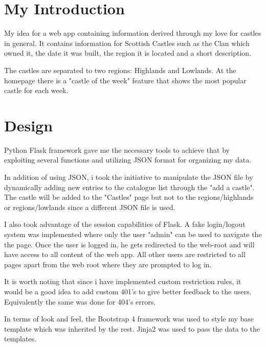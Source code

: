 \documentclass[10pt, a4paper]{article}
\title{\mytitle}
\author{\myauthor\hspace{1em}\\\contact\\Edinburgh Napier University\hspace{0.5em}-\hspace{0.5em}\mymodule}
\date{}
\begin{document}
	\maketitle

    

	\section{ My Introduction}
	
	My idea for a web app containing information derived through my love for castles in general. It  contains information for Scottish Castles such as the Clan which owned it, the date it was built, the region it is located and a short description.
	
	The castles are separated to two regions: Highlands and Lowlands. At the homepage there is a "castle of the week" feature that shows the most popular castle for each week.


	\section{Design}
	
    Python Flask framework gave me the necessary tools to achieve that by exploiting several functions and utilizing JSON format for organizing my data.
    
    In addition of using JSON, i took the initiative to manipulate the JSON file by dynamically adding new entries to the catalogue list through the "add a castle". The castle will be added to the "Castles" page but not to the regions/highlands or regions/lowlands since a different JSON file is used.
    
    I also took advantage of the session capabilities of Flask. A fake login/logout system was implemented where only the user "admin" can be used to navigate the the page. Once the user is logged in, he gets redirected to the web-root and will have access to all content of the web app. All other users are restricted to all pages apart from the web root where they are prompted to log in.
	
	It is worth noting that since i have implemented custom restriction rules, it would be a good idea to add custom 401's to give better feedback to the users. Equivalently the same was done for 404's errors.
	
	In terms of look and feel, the Bootstrap 4 framework was used to style my base template which was inherited by the rest. Jinja2 was used to pass the data to the templates.
	
\end{document}
